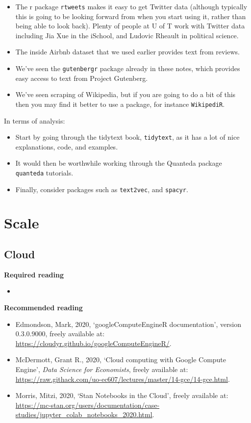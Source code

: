 \documentclass[
]{book}
\providecommand{\tightlist}{%
  \setlength{\itemsep}{0pt}\setlength{\parskip}{0pt}}
\begin{document}
\begin{itemize}
\tightlist
\item
  The r package \texttt{rtweets} makes it easy to get Twitter data (although typically this is going to be looking forward from when you start using it, rather than being able to look back). Plenty of people at U of T work with Twitter data including Jia Xue in the iSchool, and Ludovic Rheault in political science.
\item
  The inside Airbnb dataset that we used earlier provides text from reviews.
\item
  We've seen the \texttt{gutenbergr} package already in these notes, which provides easy access to text from Project Gutenberg.
\item
  We've seen scraping of Wikipedia, but if you are going to do a bit of this then you may find it better to use a package, for instance \texttt{WikipediR}.
\end{itemize}

In terms of analysis:

\begin{itemize}
\tightlist
\item
  Start by going through the tidytext book, \texttt{tidytext}, as it has a lot of nice explanations, code, and examples.
\item
  It would then be worthwhile working through the Quanteda package \texttt{quanteda} tutorials.
\item
  Finally, consider packages such as \texttt{text2vec}, and \texttt{spacyr}.
\end{itemize}

\hypertarget{part-scale}{%
\part{Scale}\label{part-scale}}

\hypertarget{cloud}{%
\chapter{Cloud}\label{cloud}}

\textbf{Required reading}

\begin{itemize}
\item
\end{itemize}

\textbf{Recommended reading}

\begin{itemize}
\tightlist
\item
  Edmondson, Mark, 2020, `googleComputeEngineR documentation', version 0.3.0.9000, freely available at: \url{https://cloudyr.github.io/googleComputeEngineR/}.
\item
  McDermott, Grant R., 2020, `Cloud computing with Google Compute Engine', \emph{Data Science for Economists}, freely available at: \url{https://raw.githack.com/uo-ec607/lectures/master/14-gce/14-gce.html}.
\item
  Morris, Mitzi, 2020, `Stan Notebooks in the Cloud', freely available at: \url{https://mc-stan.org/users/documentation/case-studies/jupyter_colab_notebooks_2020.html}.
\end{itemize}
\end{document}
